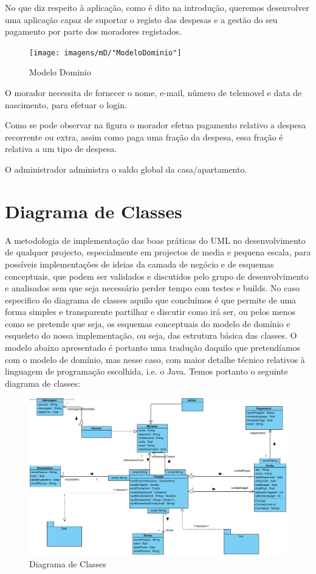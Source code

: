 No que diz respeito à aplicação, como é dito na introdução, queremos desenvolver uma aplicação capaz de suportar o registo das despesas e a gestão do seu pagamento por parte dos moradores registados.


\begin{figure}[htb!]
	\texttt{[image: imagens/mD/"ModeloDominio"]}  
	\caption{Modelo Dominio}  
\end{figure}

O morador necessita de fornecer o nome, e-mail, número de telemovel e data de nascimento, para efetuar o login. 

Como se pode observar na figura o morador efetua pagamento relativo a despesa recorrente ou extra, assim como paga uma fração da despesa, essa fração é relativa a um tipo de despesa. 


O administrador administra o saldo global da casa/apartamento. 


\newpage

\section{Diagrama de Classes}
A metodologia de implementação das boas práticas do UML no desenvolvimento de qualquer
projecto, especialmente em projectos de media e pequena escala, para possíveis implementações de ideias da camada de negócio e de esquemas conceptuais, que podem ser validados e discutidos pelo grupo de desenvolvimento e analisados sem que seja necessário perder tempo com testes e builds.
No caso especifico do diagrama de classes aquilo que concluímos é que permite de uma forma simples e transparente partilhar e discutir como irá ser, ou pelos menos como se pretende que seja, os esquemas
conceptuais do modelo de domínio e esqueleto do nossa implementação, ou seja, das estrutura básica das classes. O modelo abaixo apresentado é portanto uma tradução daquilo que pretendíamos com o
modelo de domínio, mas nesse caso, com maior detalhe técnico relativos à linguagem de programação escolhida, i.e. o Java. Temos portanto o seguinte diagrama de classes:

\begin{figure}[htb!]
	\centering
	\includegraphics[scale=0.47]{imagens/diagramaClasses/DiagramaClasse}  
	\caption{Diagrama de Classes }  
\end{figure}


